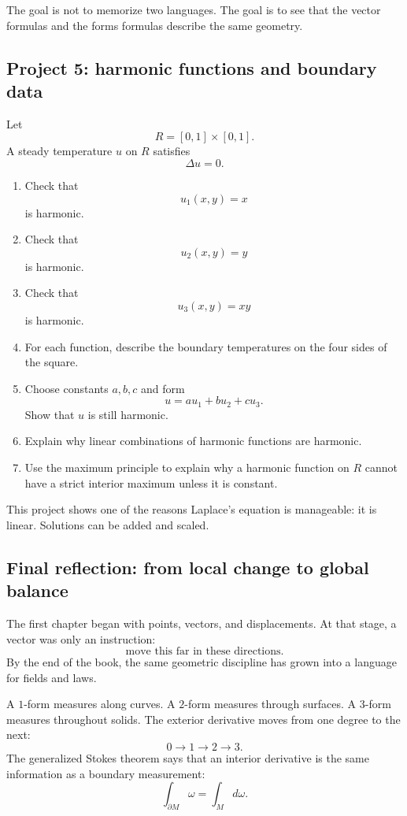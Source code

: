 The goal is not to memorize two languages.  The goal is to see that the vector formulas
and the forms formulas describe the same geometry.

\subsection{Project 5: harmonic functions and boundary data}

Let
\[
    R=[0,1]\times[0,1].
\]
A steady temperature \(u\) on \(R\) satisfies
\[
    \Delta u=0.
\]

\begin{enumerate}
\item Check that
\[
    u_1(x,y)=x
\]
is harmonic.

\item Check that
\[
    u_2(x,y)=y
\]
is harmonic.

\item Check that
\[
    u_3(x,y)=xy
\]
is harmonic.

\item For each function, describe the boundary temperatures on the four sides of the
square.

\item Choose constants \(a,b,c\) and form
\[
    u=a u_1+b u_2+c u_3.
\]
Show that \(u\) is still harmonic.

\item Explain why linear combinations of harmonic functions are harmonic.

\item Use the maximum principle to explain why a harmonic function on \(R\) cannot
have a strict interior maximum unless it is constant.
\end{enumerate}

This project shows one of the reasons Laplace's equation is manageable: it is linear.
Solutions can be added and scaled.

\subsection{Final reflection: from local change to global balance}

The first chapter began with points, vectors, and displacements.  At that stage, a vector
was only an instruction:
\[
    \text{move this far in these directions.}
\]
By the end of the book, the same geometric discipline has grown into a language for
fields and laws.

A \(1\)-form measures along curves.  A \(2\)-form measures through surfaces.  A
\(3\)-form measures throughout solids.  The exterior derivative moves from one degree
to the next:
\[
    0\longrightarrow 1\longrightarrow 2\longrightarrow 3.
\]
The generalized Stokes theorem says that an interior derivative is the same information
as a boundary measurement:
\[
    \int_{\partial M}\omega=\int_M d\omega.
\]

